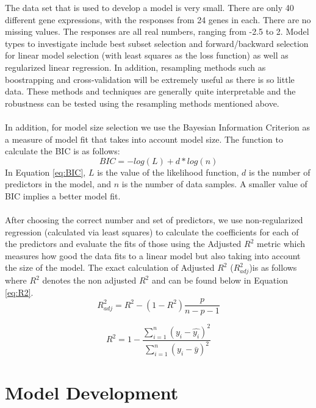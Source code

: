 \documentclass{article}
\begin{document}
%
The data set that is used to develop a model is very small.  There are only 40 different gene expressions, with the responses from 24 genes
in each.  There are no missing values.  The responses are all real numbers, ranging from -2.5 to 2.  Model types to investigate include best subset selection and forward/backward selection for linear model selection (with least squares as the loss function) as well as regularized linear regression.  In addition, resampling methods such as boostrapping and cross-validation will be extremely useful as there is so little data.  These methods and techniques are generally quite interpretable and the robustness can be tested using the resampling methods mentioned above.\\
\null\\
In addition, for model size selection we use the Bayesian Information Criterion as a measure of model fit that takes into account model size.  The function to calculate the BIC is as follows:
\begin{equation}
BIC=-log(L)+d*log(n)
\label{eq:BIC}
\end{equation}
In Equation \ref{eq:BIC}, $L$ is the value of the likelihood function, $d$ is the number of predictors in the model, and $n$ is the number of data samples.  A smaller value of BIC implies a better model fit.  \\
\null\\
After choosing the correct number and set of predictors, we use non-regularized regression (calculated via least squares) to calculate the coefficients for each of the predictors and evaluate the fits of those using the Adjusted $R^2$ metric which measures how good the data fits to a linear model but also taking into account the size of the model.  The exact calculation of Adjusted $R^2$ ($R^2_{adj}$)is as follows where $R^2$ denotes the non adjusted $R^2$ and can be found below in Equation \ref{eq:R2}.
\begin{equation}
R^2_{adj} = R^2-(1-R^2)\frac{p}{n-p-1}
\label{eq:AdjR2}
\end{equation}

\begin{equation}
	R^2=1-\frac{\sum_{i=1}^n (y_i-\hat{y_i})^2}{\sum_{i=1}^n (y_i-\bar{y})^2}
	\label{eq:R2}
\end{equation}
%
\section{Model Development}
\end{document}
